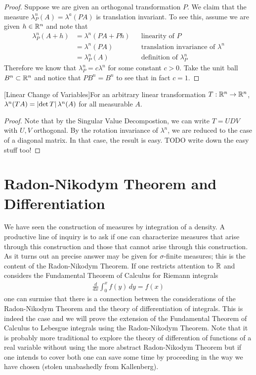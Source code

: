 \begin{proof}Suppose we are given an orthogonal transformation $P$.
  We claim that the measure $\lambda^n_P(A) = \lambda^a(P A)$ is
  translation invariant.   To see this, assume we are given $h \in
  \mathbb{R}^n$ and note that 
\begin{align*}
\lambda^n_P(A + h) &= \lambda^n(P A + Ph)  & &\text{linearity of $P$} \\
&= \lambda^n(PA) & &\text{translation invariance of $\lambda^n$} \\
&= \lambda^n_P(A) & &\text{definition of $\lambda^n_P$}
\end{align*}
Therefore we know that $\lambda^n_P = c \lambda^n$ for some constant
$c>0$.  Take the unit ball $B^n \subset \mathbb{R}^n$ and notice that $P
B^n = B^n$ to see that in fact $c = 1$.
\end{proof}
\begin{cor}\label{LesbegueLinearChangeOfVariables}[Linear Change of Variables]For an arbitrary linear transformation $T : \mathbb{R}^n \to
  \mathbb{R}^n$, $\lambda^n(T A) = \left \vert \det{T} \right \vert \lambda^n(A)$ for all
  measurable $A$.
\end{cor}
\begin{proof}Note that by the Singular Value Decompostion, we can
  write $T = U D V$ with $U,V$ orthogonal.  By the rotation invariance
  of $\lambda^n$, we are reduced to the case of a diagonal matrix.  In
  that case, the result is easy.
TODO write down the easy stuff too!
\end{proof}
\section{Radon-Nikodym Theorem and Differentiation}
We have seen the construction of measures by integration of a
density.  A productive line of inquiry is to ask if one can
characterize measures that arise through this construction and those
that cannot arise through this construction.  As it
turns out an precise answer may be given for $\sigma$-finite measures;
this is the content of the Radon-Nikodym Theorem.  If one restricts
attention to $\mathbb{R}$ and considers the Fundamental Theorem of
Calculus for Riemann integrals
\begin{align*}
\frac{d}{dx} \int_0^x f(y) \, dy = f(x)
\end{align*}
one can surmise that there is a connection between the considerations
of the Radon-Nikodym Theorem and the theory of differentiation of
integrals.  This is indeed the case and we will prove the extension of
the Fundamental Theorem of Calculus to Lebesgue integrals using the
Radon-Nikodym Theorem.  Note that it is probably more traditional to
explore the theory of differention of functions of a real variable
without using the more abstract Radon-Nikodym Theorem but if one
intends to cover both one can save some time by proceeding in the way
we have chosen (stolen unabashedly from Kallenberg).

